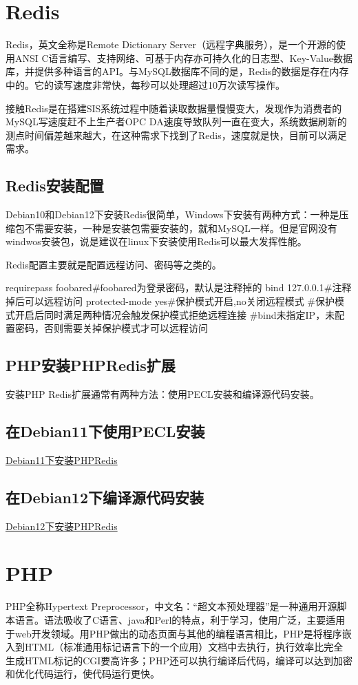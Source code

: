 \section{Redis}
Redis，英文全称是Remote Dictionary Server（远程字典服务），是一个开源的使用ANSI C语言编写、支持网络、可基于内存亦可持久化的日志型、Key-Value数据库，并提供多种语言的API。与MySQL数据库不同的是，Redis的数据是存在内存中的。它的读写速度非常快，每秒可以处理超过10万次读写操作。

接触Redis是在搭建SIS系统过程中随着读取数据量慢慢变大，发现作为消费者的MySQL写速度赶不上生产者OPC DA速度导致队列一直在变大，系统数据刷新的测点时间偏差越来越大，在这种需求下找到了Redis，速度就是快，目前可以满足需求。
\subsection{Redis安装配置}
Debian10和Debian12下安装Redis很简单，Windows下安装有两种方式：一种是压缩包不需要安装，一种是安装包需要安装的，就和MySQL一样。但是官网没有windwos安装包，说是建议在linux下安装使用Redis可以最大发挥性能。

Redis配置主要就是配置远程访问、密码等之类的。
\begin{shell}
requirepass foobared#foobared为登录密码，默认是注释掉的
bind 127.0.0.1#注释掉后可以远程访问
protected-mode yes#保护模式开启,no关闭远程模式
#保护模式开启后同时满足两种情况会触发保护模式拒绝远程连接
#bind未指定IP，未配置密码，否则需要关掉保护模式才可以远程访问

\end{shell}
\subsection{PHP安装PHPRedis扩展}
安装PHP Redis扩展通常有两种方法：使用PECL安装和编译源代码安装。
\subsection{在Debian11下使用PECL安装}
\href{https://blog.csdn.net/weixin_42578963/article/details/142968319?spm=1001.2014.3001.5506}{Debian11下安装PHPRedis}
\subsection{在Debian12下编译源代码安装}
\href{https://blog.csdn.net/nbv12589/article/details/135626279?spm=1001.2014.3001.5506}{Debian12下安装PHPRedis}

\section{PHP}
PHP全称Hypertext Preprocessor，中文名：“超文本预处理器”是一种通用开源脚本语言。语法吸收了C语言、java和Perl的特点，利于学习，使用广泛，主要适用于web开发领域。用PHP做出的动态页面与其他的编程语言相比，PHP是将程序嵌入到HTML（标准通用标记语言下的一个应用）文档中去执行，执行效率比完全生成HTML标记的CGI要高许多；PHP还可以执行编译后代码，编译可以达到加密和优化代码运行，使代码运行更快。
